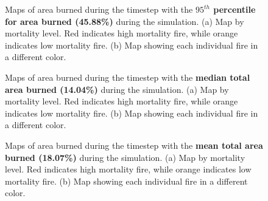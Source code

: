 \begin{figure}[!htbp]
  \centering
  \caption{Maps of area burned during the timestep with the \textbf{$95^{th}$ percentile for area burned (45.88\%)} during the simulation. (a) Map by mortality level. Red indicates high mortality fire, while orange indicates low mortality fire. (b) Map showing each individual fire in a different color.}
  \label{fig:darea_max_map}
\end{figure}

\begin{figure}[!htbp]
  \centering
  \caption{Maps of area burned during the timestep with the \textbf{median total area burned (14.04\%)} during the simulation. (a) Map by mortality level. Red indicates high mortality fire, while orange indicates low mortality fire. (b) Map showing each individual fire in a different color.}
  \label{fig:darea_median_map}
\end{figure}

\begin{figure}[!htbp]
  \centering
  \caption{Maps of area burned during the timestep with the \textbf{mean total area burned (18.07\%)} during the simulation. (a) Map by mortality level. Red indicates high mortality fire, while orange indicates low mortality fire. (b) Map showing each individual fire in a different color.}
  \label{fig:darea_mean_map}
\end{figure}

\clearpage


